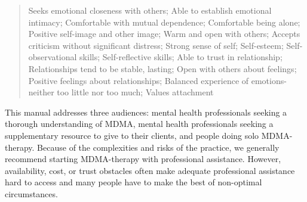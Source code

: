 \documentclass[12pt,letterpaper]{book}
\begin{document}
\begin{quotation}
Seeks emotional closeness with others; Able to establish emotional intimacy; Comfortable with mutual dependence; Comfortable being alone; Positive self-image and other image; Warm and open with others; Accepts criticism without significant distress; Strong sense of self; Self-esteem; Self-observational skills; Self-reflective skills; Able to trust in relationship; Relationships tend to be stable, lasting; Open with others about feelings; Positive feelings about relationships; Balanced experience of emotions-neither too little nor too much; Values attachment
\end{quotation}

This manual addresses three audiences: mental health professionals seeking a thorough understanding of MDMA, mental health professionals seeking a supplementary resource to give to their clients, and people doing solo MDMA-therapy. Because of the complexities and risks of the practice, we generally recommend starting MDMA-therapy with professional assistance. However, availability, cost, or trust obstacles often make adequate professional assistance hard to access and many people have to make the best of non-optimal circumstances.
\end{document}

